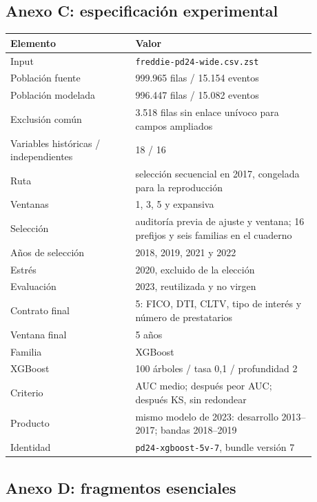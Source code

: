 \documentclass[10pt,a4paper]{article}
\newcommand{\DataFile}{\texttt{freddie-pd24-wide.csv.zst}}
\newcommand{\SourceLoans}{999.965}
\newcommand{\SourceEvents}{15.154}
\newcommand{\ModelLoans}{996.447}
\newcommand{\ModelEvents}{15.082}
\newcommand{\SelectedFamily}{XGBoost}
\newcommand{\SelectedK}{5}
\newcommand{\SelectedWindow}{5}
\newcommand{\SelectedFeatures}{FICO, DTI, CLTV, tipo de interés y número de prestatarios}
\newcommand{\DevelopmentPeriod}{2013--2017}
\newcommand{\BandPeriod}{2018--2019}
\newcommand{\XGBTrees}{100}
\newcommand{\XGBRate}{0,1}
\newcommand{\XGBDepth}{2}
\newcommand{\BundleVersion}{7}
\newcommand{\ModelVersion}{\texttt{pd24-xgboost-5v-7}}
\begin{document}
\clearpage
\subsection{Anexo C: especificación experimental}

\begin{center}\small
\begin{tabular}{p{0.36\linewidth} p{0.52\linewidth}}
\textbf{Elemento} & \textbf{Valor}\\ \hline
Input & \DataFile{}\\
Población fuente & \SourceLoans{} filas / \SourceEvents{} eventos\\
Población modelada & \ModelLoans{} filas / \ModelEvents{} eventos\\
Exclusión común & 3.518 filas sin enlace unívoco para campos ampliados\\
Variables históricas / independientes & 18 / 16\\
Ruta & selección secuencial en 2017, congelada para la reproducción\\
Ventanas & 1, 3, 5 y expansiva\\
Selección & auditoría previa de ajuste y ventana; 16 prefijos y seis familias en el cuaderno\\
Años de selección & 2018, 2019, 2021 y 2022\\
Estrés & 2020, excluido de la elección\\
Evaluación & 2023, reutilizada y no virgen\\
Contrato final & \SelectedK{}: \SelectedFeatures{}\\
Ventana final & \SelectedWindow{} años\\
Familia & \SelectedFamily{}\\
XGBoost & \XGBTrees{} árboles / tasa \XGBRate{} / profundidad \XGBDepth{}\\
Criterio & AUC medio; después peor AUC; después KS, sin redondear\\
Producto & mismo modelo de 2023: desarrollo \DevelopmentPeriod{}; bandas \BandPeriod{}\\
Identidad & \ModelVersion{}, bundle versión \BundleVersion{}\\
\end{tabular}
\end{center}

\clearpage
\subsection{Anexo D: fragmentos esenciales}
\end{document}
